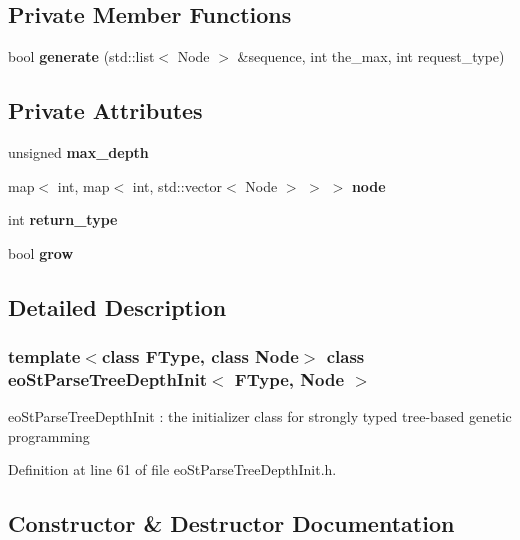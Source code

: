\subsection*{Private Member Functions}
\begin{CompactItemize}
\item 
bool {\bf generate} (std::list$<$ Node $>$ \&sequence, int the\_\-max, int request\_\-type)\label{classeo_st_parse_tree_depth_init_d0}

\end{CompactItemize}
\subsection*{Private Attributes}
\begin{CompactItemize}
\item 
unsigned {\bf max\_\-depth}\label{classeo_st_parse_tree_depth_init_r0}

\item 
map$<$ int, map$<$ int, std::vector$<$ Node $>$ $>$ $>$ {\bf node}\label{classeo_st_parse_tree_depth_init_r1}

\item 
int {\bf return\_\-type}\label{classeo_st_parse_tree_depth_init_r2}

\item 
bool {\bf grow}\label{classeo_st_parse_tree_depth_init_r3}

\end{CompactItemize}


\subsection{Detailed Description}
\subsubsection*{template$<$class FType, class Node$>$ class eo\-St\-Parse\-Tree\-Depth\-Init$<$ FType, Node $>$}

eo\-St\-Parse\-Tree\-Depth\-Init : the initializer class for strongly typed tree-based genetic programming 



Definition at line 61 of file eo\-St\-Parse\-Tree\-Depth\-Init.h.

\subsection{Constructor \& Destructor Documentation}
